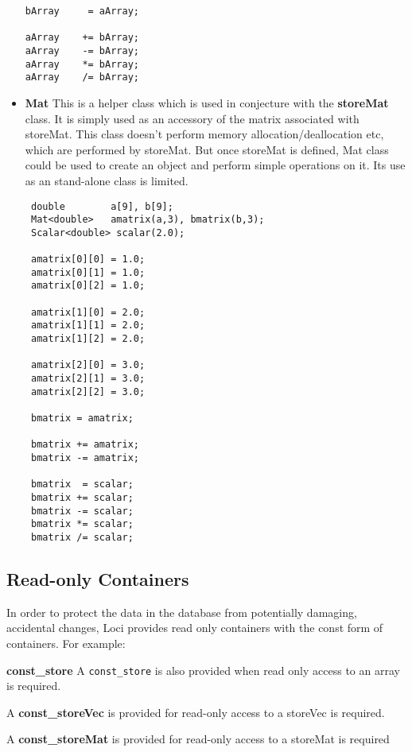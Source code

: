 \begin{itemize}
\begin{verbatim}
bArray     = aArray;

aArray    += bArray;
aArray    -= bArray;
aArray    *= bArray;
aArray    /= bArray;
\end{verbatim}
%
\item {\bf Mat} This is a helper class which is used in conjecture with the {\bf
storeMat} class. It is simply used as an accessory of the matrix associated
with storeMat. This class doesn't perform memory allocation/deallocation
etc, which are performed by storeMat. But once storeMat is defined, Mat class
could be used to create an object and perform simple operations on it. Its
use as an stand-alone class is limited.
%
\begin{verbatim}
 double        a[9], b[9];
 Mat<double>   amatrix(a,3), bmatrix(b,3);
 Scalar<double> scalar(2.0);

 amatrix[0][0] = 1.0;
 amatrix[0][1] = 1.0;
 amatrix[0][2] = 1.0;

 amatrix[1][0] = 2.0;
 amatrix[1][1] = 2.0;
 amatrix[1][2] = 2.0;

 amatrix[2][0] = 3.0;
 amatrix[2][1] = 3.0;
 amatrix[2][2] = 3.0;

 bmatrix = amatrix;

 bmatrix += amatrix;
 bmatrix -= amatrix;

 bmatrix  = scalar;
 bmatrix += scalar;
 bmatrix -= scalar;
 bmatrix *= scalar;
 bmatrix /= scalar;
\end{verbatim}
\end{itemize}
%
\subsection { Read-only Containers }
\par In order to protect the data in the database from potentially damaging,
accidental changes, Loci provides read only containers with the const form of
containers. For example: 
%  
\par {\bf const\_store }A {\tt const\_store} is also provided when
read only access to an array is required.
%  
\par A {\bf const\_storeVec} is  provided for read-only access to a storeVec is required.
\par A {\bf const\_storeMat} is provided for read-only access to a storeMat is required

